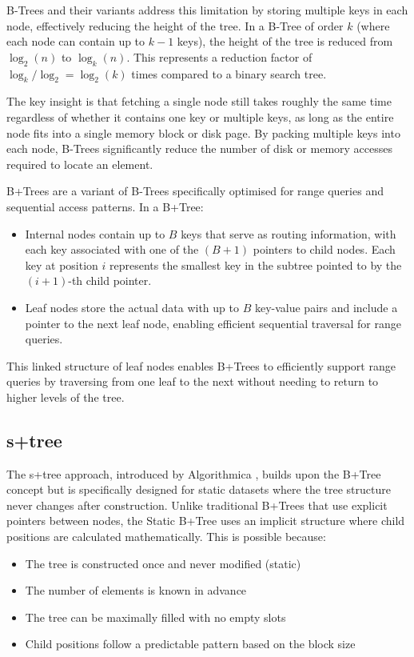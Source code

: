 B-Trees and their variants address this limitation by storing multiple keys in each node, effectively reducing the height of the tree. In a B-Tree of order $k$ (where each node can contain up to $k-1$ keys), the height of the tree is reduced from $\log_2(n)$ to $\log_k(n)$. This represents a reduction factor of $\log_k/\log_2 = \log_2(k)$ times compared to a binary search tree.

The key insight is that fetching a single node still takes roughly the same time regardless of whether it contains one key or multiple keys, as long as the entire node fits into a single memory block or disk page. By packing multiple keys into each node, B-Trees significantly reduce the number of disk or memory accesses required to locate an element.


B+Trees are a variant of B-Trees specifically optimised for range queries and sequential access patterns. In a B+Tree:
\begin{itemize}
  \item Internal nodes contain up to $B$ keys that serve as routing information, with each key associated with one of the $(B+1)$ pointers to child nodes. Each key at position $i$ represents the smallest key in the subtree pointed to by the $(i+1)$-th child pointer.
  \item Leaf nodes store the actual data with up to $B$ key-value pairs and include a pointer to the next leaf node, enabling efficient sequential traversal for range queries.
\end{itemize}

This linked structure of leaf nodes enables B+Trees to efficiently support range queries by traversing from one leaf to the next without needing to return to higher levels of the tree.

\subsection{\texorpdfstring{\ac{s+tree}}{S+tree}}
\label{tb:stree}

The \ac{s+tree} approach, introduced by Algorithmica \citep{static_b_trees}, builds upon the B+Tree concept but is specifically designed for static datasets where the tree structure never changes after construction. Unlike traditional B+Trees that use explicit pointers between nodes, the Static B+Tree uses an implicit structure where child positions are calculated mathematically.
This is possible because:
\begin{itemize}
  \item The tree is constructed once and never modified (static)
  \item The number of elements is known in advance
  \item The tree can be maximally filled with no empty slots
  \item Child positions follow a predictable pattern based on the block size
\end{itemize}

